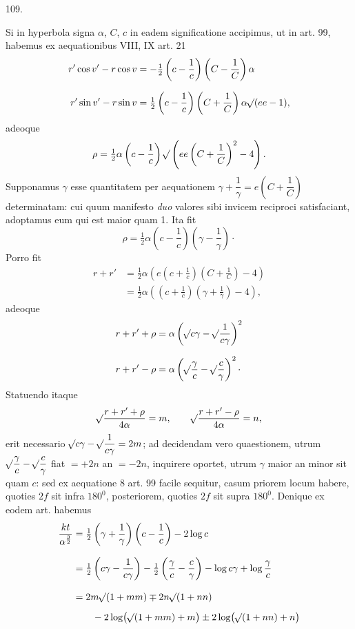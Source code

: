 \par{}\medskip
\hypertarget{native-151-article109}{}
\begin{center}109.\end{center}
Si in hyperbola signa $\alpha$, $C$, $c$ in eadem significatione accipimus, ut in art. 99, habemus ex aequationibus VIII, IX art. 21
\[
\begin{aligned}
r'\cos v'-r\cos v&=-\tfrac12\left(c-\frac1c\right)\left(C-\frac1C\right)\alpha\\[.7em]
r'\sin v'-r\sin v&=\tfrac12\left(c-\frac1c\right)\left(C+\frac1C\right)\alpha\mathord{{}^{}\!\surd}(ee-1),
\end{aligned}
\]
\noindent adeoque
\[
\rho=\tfrac12\alpha\left(c-\frac1c\right)\mathord{{}^{}\!\surd}\left(ee\left(C+\frac1C\right)^2-4\right).
\]
\noindent{}Supponamus $\gamma$ esse quantitatem per aequationem $\gamma+\dfrac1\gamma=e\left(C+\dfrac1C\right)$ determinatam: cui quum manifesto \emph{duo} valores sibi invicem reciproci satisfaciant, adoptamus eum qui est maior quam 1. Ita fit
\[
\rho=\tfrac12\alpha\left(c-\frac1c\right)\left(\gamma-\frac1\gamma\right)\mathpunct{\cdot}
\]
\noindent Porro fit
\[
\begin{aligned}
r+r'&=\tfrac12\alpha\left(e\left(c+\frac1c\right)\left(C+\frac1C\right)-4\right)\\[.7em]
&=\tfrac12\alpha\left(\left(c+\frac1c\right)\left(\gamma+\frac1\gamma\right)-4\right),
\end{aligned}
\]
\noindent adeoque
\[
\begin{aligned}
r+r'+\rho&=\alpha\left(\mathord{{}^{}\!\surd}c\gamma-\mathord{{}^{}\!\surd}\frac1{c\gamma}\right)^2\\[.7em]
r+r'-\rho&=\alpha\left(\mathord{{}^{}\!\surd}\frac\gamma c-\mathord{{}^{}\!\surd}\frac c\gamma\right)^2\mathpunct{\cdot}
\end{aligned}
\]
\noindent Statuendo itaque
\[
\mathord{{}^{}\!\surd}\frac{r+r'+\rho}{4\alpha}=m,\qquad\mathord{{}^{}\!\surd}\frac{r+r'-\rho}{4\alpha}=n,
\]
\noindent erit necessario $\mathord{{}^{}\!\surd}c\gamma-\mathord{{}^{}\!\surd}\dfrac1{c\gamma}=2m$; ad decidendam vero quaestionem, utrum $\mathord{{}^{}\!\surd}\dfrac\gamma c-\mathord{{}^{}\!\surd}\dfrac c\gamma$ fiat $=+2n$ an $=-2n$, inquirere oportet, utrum $\gamma$ maior an minor sit quam $c$: sed ex aequatione 8 art. 99 facile sequitur, casum priorem locum habere, quoties $2f$ sit infra $180^0$, posteriorem, quoties $2f$ sit supra $180^0$. Denique ex eodem art. habemus
\[
\begin{aligned}
\frac{kt}{\alpha^{\frac32}}&=\tfrac12\left(\gamma+\frac1\gamma\right)\left(c-\frac1c\right)-2\log c\\[.8em]
&=\tfrac12\left(c\gamma-\frac1{c\gamma}\right)-\tfrac12\left(\frac\gamma c-\frac c\gamma\right)-\log c\gamma+\log\frac\gamma c\\[.8em]
&=2m\mathord{{}^{}\!\surd}(1+mm)\mp2n\mathord{{}^{}\!\surd}(1+nn)\\[.5em]
&\qquad-2\log\bigl(\mathord{{}^{}\!\surd}(1+mm)+m\bigr)\pm2\log\bigl(\mathord{{}^{}\!\surd}(1+nn)+n\bigr)
\end{aligned}
\]
